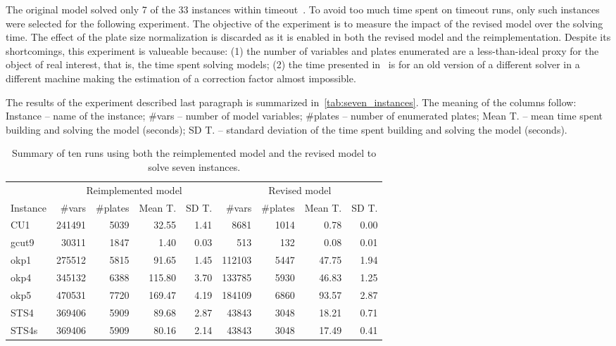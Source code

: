 \documentclass[runningheads]{llncs}
\begin{document}
The original model solved only 7 of the 33 instances within timeout~\cite{furini:2016}.
To avoid too much time spent on timeout runs, only such instances were selected for the following experiment.
The objective of the experiment is to measure the impact of the revised model over the solving time. 
The effect of the plate size normalization is discarded as it is enabled in both the revised model and the reimplementation.
Despite its shortcomings, this experiment is valueable because: (1) the number of variables and plates enumerated are a less-than-ideal proxy for the object of real interest, that is, the time spent solving models; (2) the time presented in~\cite{furini:2016} is for an old version of a different solver in a different machine making the estimation of a correction factor almost impossible.

The results of the experiment described last paragraph is summarized in~\autoref{tab:seven_instances}.
The meaning of the columns follow: 
Instance -- name of the instance; \#vars -- number of model variables; \#plates -- number of enumerated plates; Mean T. -- mean time spent building and solving the model (seconds); SD T. -- standard deviation of the time spent building and solving the model (seconds).

\begin{table}
\caption{Summary of ten runs using both the reimplemented model and the revised model to solve seven instances.}
\setlength\tabcolsep{2.5px}
\def\arraystretch{1.1}
\begin{tabular}{@{\extracolsep{4pt}}lrrrrrrrr@{}}
& \multicolumn{4}{c}{Reimplemented model} & \multicolumn{4}{c}{Revised model}\\
\cline{2-5}\cline{6-9}
Instance & \#vars & \#plates & Mean T. & SD T. & \#vars & \#plates & Mean T. & SD T.\\
\hline
CU1 & 241491 & 5039 & 32.55 & 1.41 & 8681 & 1014 & 0.78 & 0.00 \\
gcut9 & 30311 & 1847 & 1.40 & 0.03 & 513 & 132 & 0.08 & 0.01 \\
okp1 & 275512 & 5815 & 91.65 & 1.45 & 112103 & 5447 & 47.75 & 1.94 \\
okp4 & 345132 & 6388 & 115.80 & 3.70 & 133785 & 5930 & 46.83 & 1.25 \\
okp5 & 470531 & 7720 & 169.47 & 4.19 & 184109 & 6860 & 93.57 & 2.87 \\
STS4 & 369406 & 5909 & 89.68 & 2.87 & 43843 & 3048 & 18.21 & 0.71 \\
STS4s & 369406 & 5909 & 80.16 & 2.14 & 43843 & 3048 & 17.49 & 0.41 \\
\hline
\end{tabular}
\label{tab:seven_instances}
\end{table}
\end{document}
